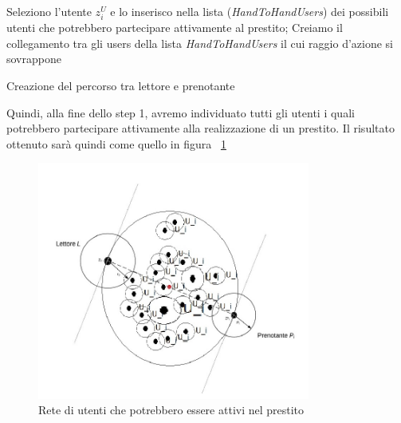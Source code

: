 \begin{itemize}
\begin{itemize}
\begin{algorithm}[H]
{{				Seleziono l'utente $ z_{i}^U $ e lo inserisco nella lista (\textit{HandToHandUsers}) dei possibili utenti che potrebbero partecipare attivamente al prestito;
			}
			}
			Creiamo il collegamento tra gli users della lista \textit{HandToHandUsers} il cui raggio d'azione si sovrappone\;
			\caption{Creazione del percorso tra lettore e prenotante}
		\end{algorithm}
		
		Quindi, alla fine dello step 1, avremo individuato tutti gli utenti i quali potrebbero partecipare attivamente alla realizzazione di un prestito.
		Il risultato ottenuto sarà quindi come quello in figura ~\ref{fig:UsersNet}
						
		\begin{figure}[h!]
			\centering
			\includegraphics[width=0.8\textwidth]{Immagini/Algorithm_UsersNet}
			\caption{Rete di utenti che potrebbero essere attivi nel prestito}
			\label{fig:UsersNet}
		\end{figure}
		
	\end{itemize}
\end{itemize}